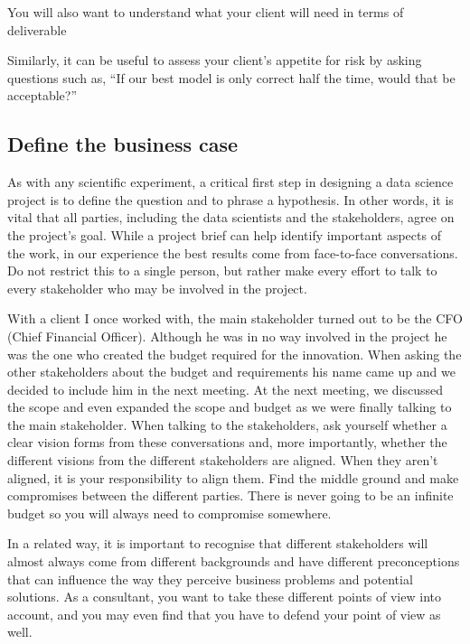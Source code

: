 \documentclass[
]{book}
\begin{document}
You will also want to understand what your client will need in terms of deliverable

Similarly, it can be useful to assess your client's appetite for risk by asking questions such as, ``If our best model is only correct half the time, would that be acceptable?''

\hypertarget{define-the-business-case}{%
\subsection{Define the business case}\label{define-the-business-case}}

As with any scientific experiment, a critical first step in designing a data science project is to define the question and to phrase a hypothesis. In other words, it is vital that all parties, including the data scientists and the stakeholders, agree on the project's goal. While a project brief can help identify important aspects of the work, in our experience the best results come from face-to-face conversations. Do not restrict this to a single person, but rather make every effort to talk to every stakeholder who may be involved in the project.

With a client I once worked with, the main stakeholder turned out to be the CFO (Chief Financial Officer). Although he was in no way involved in the project he was the one who created the budget required for the innovation. When asking the other stakeholders about the budget and requirements his name came up and we decided to include him in the next meeting. At the next meeting, we discussed the scope and even expanded the scope and budget as we were finally talking to the main stakeholder. When talking to the stakeholders, ask yourself whether a clear vision forms from these conversations and, more importantly, whether the different visions from the different stakeholders are aligned. When they aren't aligned, it is your responsibility to align them. Find the middle ground and make compromises between the different parties. There is never going to be an infinite budget so you will always need to compromise somewhere.

In a related way, it is important to recognise that different stakeholders will almost always come from different backgrounds and have different preconceptions that can influence the way they perceive business problems and potential solutions. As a consultant, you want to take these different points of view into account, and you may even find that you have to defend your point of view as well.
\end{document}
